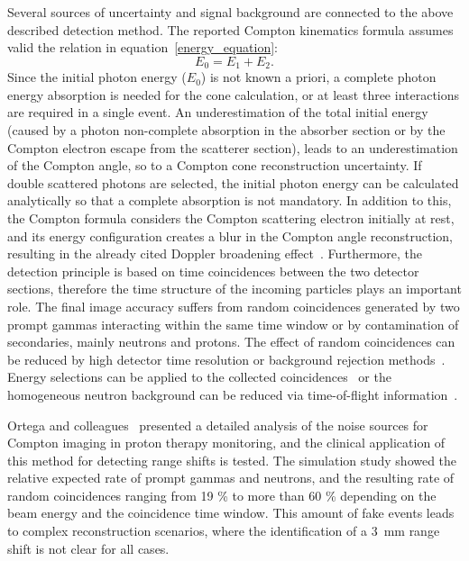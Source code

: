 Several sources of uncertainty and signal background are connected to the above described detection method. The reported Compton kinematics formula assumes valid the relation in equation~\ref{energy_equation}:
 \begin{equation}
E_{0} = E_{1}+E_{2}.
\label{energy_equation}
\end{equation} 
Since the initial photon energy (\(E_{0}\)) is not known a priori, a complete photon energy absorption is needed for the cone calculation, or at least three interactions are required in a single event. An underestimation of the total initial energy (caused by a photon non-complete absorption in the absorber section or by the Compton electron escape from the scatterer section), leads to an underestimation of the Compton angle, so to a Compton cone reconstruction uncertainty. If double scattered photons are selected, the initial photon energy can be calculated analytically so that a complete absorption is not mandatory. In addition to this, the Compton formula considers the Compton scattering electron initially at rest, and its energy configuration creates a blur in the Compton angle reconstruction, resulting in the already cited Doppler broadening effect~\cite{Doppler}. Furthermore, the detection principle is based on time coincidences between the two detector sections, therefore the time structure of the incoming particles plays an important role. The final image accuracy suffers from random coincidences generated by two prompt gammas interacting within the same time window or by contamination of secondaries, mainly neutrons and protons. The effect of random coincidences can be reduced by high detector time resolution or background rejection methods~\cite{Draeger:2017aa}. Energy selections can be applied to the collected coincidences~\cite{Polf:2009aa, Hilaire:2016aa} or the homogeneous neutron background can be reduced via time-of-flight information~\cite{Testa:2010aa}.

Ortega and colleagues~\cite{Ortega:2015aa} presented a detailed analysis of the noise sources for Compton imaging in proton therapy monitoring, and the clinical application of this method for detecting range shifts is tested. The simulation study showed the relative expected rate of prompt gammas and neutrons, and the resulting rate of random coincidences ranging from 19 \% to more than 60 \% depending on the beam energy and the coincidence time window. This amount of fake events leads to complex reconstruction scenarios, where the identification of a 3~mm range shift is not clear for all cases.

